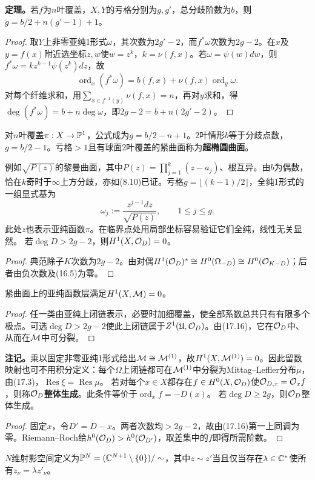 \textbf{定理。}若$f$为$n$叶覆盖，$X,Y$的亏格分别为$g,g'$，总分歧阶数为$b$，则$g=b/2+n(g'-1)+1$。
\begin{proof}
取$Y$上非零亚纯1形式$\omega$，其次数为$2g'-2$，而$f^*\omega$次数为$2g-2$。在$x$及$y=f(x)$附近选坐标$z,w$使$w=z^k$，$k=\nu(f,x)$。若$\omega=\psi(w)dw$，则$f^*\omega=kz^{k-1}\psi(z^k)dz$，故
\[
\operatorname{ord}_x(f^*\omega)=b(f,x)+\nu(f,x)\operatorname{ord}_y\omega.
\]
对每个纤维求和，用$\sum_{x\in f^{-1}(y)}\nu(f,x)=n$，再对$y$求和，得$\deg(f^*\omega)=b+n\deg\omega$，即$2g-2=b+n(2g'-2)$。
\end{proof}
对$n$叶覆盖$\pi:X\to\mathbb P^1$，公式成为$g=b/2-n+1$。2叶情形$b$等于分歧点数，$g=b/2-1$。亏格$>1$且有球面2叶覆盖的紧曲面称为\textbf{超椭圆曲面}。

例如$\sqrt{P(z)}$的黎曼曲面，其中$P(z)=\prod_{j=1}^k(z-a_j)$、根互异。由$b$为偶数，恰在$k$奇时于$\infty$上方分歧，亦如(8.10)已证。亏格$g=\lfloor(k-1)/2\rfloor$，全纯1形式的一组显式基为
\[
\omega_j:=\frac{z^{j-1}dz}{\sqrt{P(z)}},\qquad1\le j\le g.
\]
此处$z$也表示亚纯函数$\pi$。在临界点处用局部坐标容易验证它们全纯，线性无关显然。
若$\deg D>2g-2$，则$H^1(X,\mathcal O_D)=0$。
\begin{proof}
典范除子$K$次数为$2g-2$。由对偶$H^1(\mathcal O_D)^*\cong H^0(\Omega_{-D})\cong H^0(\mathcal O_{K-D})$；后者由负次数及(16.5)为零。
\end{proof}
紧曲面上的亚纯函数层满足$H^1(X,\mathcal M)=0$。
\begin{proof}
任一类由亚纯上闭链表示，必要时加细覆盖，使全部系数总共只有有限多个极点。可选$\deg D>2g-2$使此上闭链属于$Z^1(\mathfrak U,\mathcal O_D)$。由(17.16)，它在$\mathcal O_D$中、从而在$\mathcal M$中可分裂。
\end{proof}
\textbf{注记。}乘以固定非零亚纯1形式给出$\mathcal M\cong\mathcal M^{(1)}$，故$H^1(X,\mathcal M^{(1)})=0$。因此留数映射也可不用积分定义：每个$\Omega$上闭链都可在$\mathcal M^{(1)}$中分裂为Mittag--Leffler分布$\mu$，由(17.3)，$\operatorname{Res}\xi=\operatorname{Res}\mu$。
若对每个$x\in X$都存在$f\in H^0(X,\mathcal O_D)$使$\mathcal O_{D,x}=\mathcal O_xf$，则称$\mathcal O_D$\textbf{整体生成}。此条件等价于$\operatorname{ord}_xf=-D(x)$。
若$\deg D\ge2g$，则$\mathcal O_D$整体生成。
\begin{proof}
固定$x$，令$D'=D-x$。两者次数均$>2g-2$，故由(17.16)第一上同调为零。Riemann--Roch给$h^0(\mathcal O_D)>h^0(\mathcal O_{D'})$，取差集中的$f$即得所需阶数。
\end{proof}
$N$维射影空间定义为$\mathbb P^N=(\mathbb C^{N+1}\setminus\{0\})/\sim$，其中$z\sim z'$当且仅当存在$\lambda\in\mathbb C^*$使所有$z_\nu=\lambda z'_\nu$。
